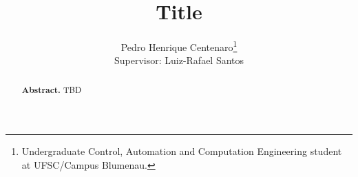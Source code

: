 \documentclass[english, a4paper, 12pt, bibliography=totoc]{scrartcl}
\title{Title}
\author{Pedro Henrique Centenaro\thanks{Undergraduate Control, Automation and Computation Engineering student at UFSC/Campus Blumenau.} \\ Supervisor: Luiz-Rafael Santos}
\date{}
\begin{document}
\onehalfspacing
\maketitle
\renewcommand\thelinenumber{\textcolor{darkgray}{\arabic{linenumber}}}

\begin{abstract}
   \textbf{Abstract.} TBD
\end{abstract}


%

% 

\printbibliography

\appendix
\end{document}
